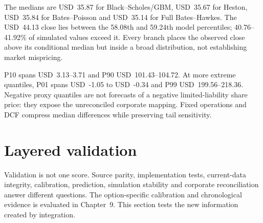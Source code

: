 The medians are USD~35.87 for Black--Scholes/GBM, USD~35.67 for Heston,
USD~35.84 for Bates--Poisson and USD~35.14 for Full Bates--Hawkes. The
USD~44.13 close lies between the 58.08th and 59.24th model percentiles;
40.76--41.92\% of simulated values exceed it. Every branch places the observed
close above its conditional median but inside a broad distribution, not
establishing market mispricing.

P10 spans USD~3.13--3.71 and P90 USD~101.43--104.72. At more extreme quantiles,
P01 spans USD~-1.05 to USD~-0.34 and P99 USD~199.56--218.36. Negative proxy
quantiles are not forecasts of a negative limited-liability share price:
they expose the unreconciled corporate mapping. Fixed operations and DCF
compress median differences while preserving tail sensitivity.

\section{Layered validation}

Validation is not one score. Source parity, implementation tests, current-data
integrity, calibration, prediction, simulation stability and corporate
reconciliation answer different questions. The option-specific calibration
and chronological evidence is evaluated in Chapter~9. This section tests the
new information created by integration.


